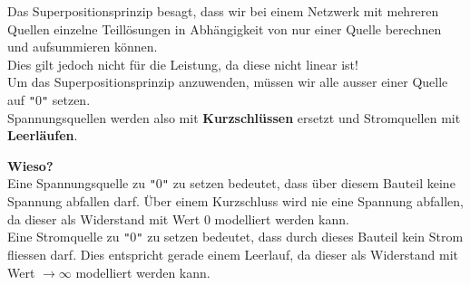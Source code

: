 																				 Das Superpositionsprinzip besagt, dass wir bei einem Netzwerk mit mehreren Quellen einzelne Teillösungen in Abhängigkeit von nur einer Quelle berechnen und aufsummieren können. \\
																				 Dies gilt jedoch nicht für die Leistung, da diese nicht linear ist! \\
																				 Um das Superpositionsprinzip anzuwenden, müssen wir alle ausser einer Quelle auf \texttt{"}0\texttt{"} setzen. \\
																				 Spannungsquellen werden also mit \textbf{Kurzschlüssen} ersetzt und Stromquellen mit \textbf{Leerläufen}. \\
																				 \begin{center}
																				 	\fix
																				 \end{center}


																				 \textbf{Wieso?} \\
																				 Eine Spannungsquelle zu \texttt{"}0\texttt{"} zu setzen bedeutet, dass über diesem Bauteil keine Spannung abfallen darf. Über einem Kurzschluss wird nie eine Spannung abfallen, da dieser als Widerstand mit Wert 0 modelliert werden kann. \\
																				 Eine Stromquelle zu \texttt{"}0\texttt{"} zu setzen bedeutet, dass durch dieses Bauteil kein Strom fliessen darf. Dies entspricht gerade einem Leerlauf, da dieser als Widerstand mit Wert $\displaystyle \rightarrow \infty$ modelliert werden kann. \\

\newpage


